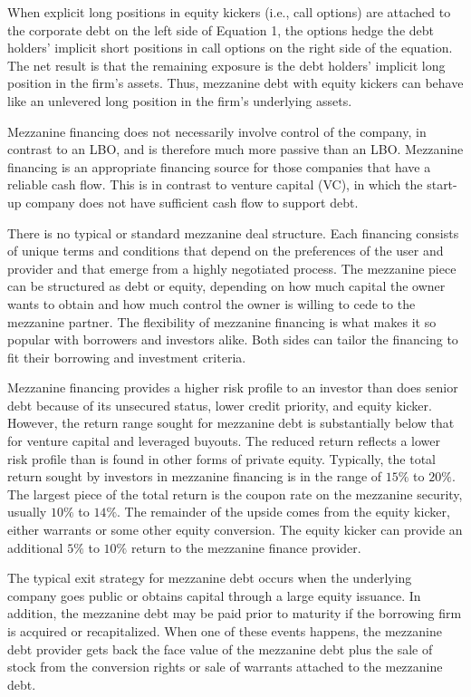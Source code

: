 \documentclass[11pt]{article}
\begin{document}
When explicit long positions in equity kickers (i.e., call options) are attached to the corporate debt on the left side of Equation 1, the options hedge the debt holders' implicit short positions in call options on the right side of the equation. The net result is that the remaining exposure is the debt holders' implicit long position in the firm's assets. Thus, mezzanine debt with equity kickers can behave like an unlevered long position in the firm's underlying assets.

Mezzanine financing does not necessarily involve control of the company, in contrast to an LBO, and is therefore much more passive than an LBO. Mezzanine financing is an appropriate financing source for those companies that have a reliable cash flow. This is in contrast to venture capital (VC), in which the start-up company does not have sufficient cash flow to support debt.

There is no typical or standard mezzanine deal structure. Each financing consists of unique terms and conditions that depend on the preferences of the user and provider and that emerge from a highly negotiated process. The mezzanine piece can be structured as debt or equity, depending on how much capital the owner wants to obtain and how much control the owner is willing to cede to the mezzanine partner. The flexibility of mezzanine financing is what makes it so popular with borrowers and investors alike. Both sides can tailor the financing to fit their borrowing and investment criteria.

Mezzanine financing provides a higher risk profile to an investor than does senior debt because of its unsecured status, lower credit priority, and equity kicker. However, the return range sought for mezzanine debt is substantially below that for venture capital and leveraged buyouts. The reduced return reflects a lower risk profile than is found in other forms of private equity. Typically, the total return sought by investors in mezzanine financing is in the range of $15 \%$ to $20 \%$. The largest piece of the total return is the coupon rate on the mezzanine security, usually $10 \%$ to $14 \%$. The remainder of the upside comes from the equity kicker, either warrants or some other equity conversion. The equity kicker can provide an additional $5 \%$ to $10 \%$ return to the mezzanine finance provider.

The typical exit strategy for mezzanine debt occurs when the underlying company goes public or obtains capital through a large equity issuance. In addition, the mezzanine debt may be paid prior to maturity if the borrowing firm is acquired or recapitalized. When one of these events happens, the mezzanine debt provider gets back the face value of the mezzanine debt plus the sale of stock from the conversion rights or sale of warrants attached to the mezzanine debt.
\end{document}
